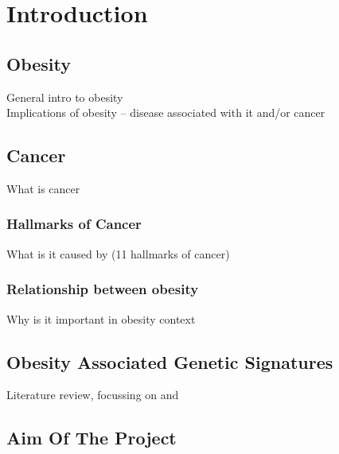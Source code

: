 \chapter{Introduction}

\section{Obesity}

General intro to obesity\\
Implications of obesity -- disease associated with it and/or cancer\\

\section{Cancer}

What is cancer\\

\subsection{Hallmarks of Cancer}

What is it caused by (11 hallmarks of cancer)\\

\subsection{Relationship between obesity}

Why is it important in obesity context\\

\section{Obesity Associated Genetic Signatures}

Literature review, focussing on \citet{Creighton2012} and \citet{Fuentes-Mattei2014}\\

\section{Aim Of The Project}


